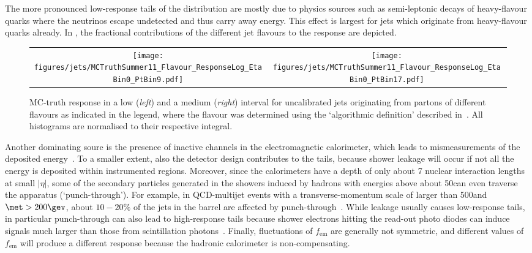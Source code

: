 The more pronounced low-response tails of the distribution are mostly due to physics sources such as semi-leptonic decays of heavy-flavour quarks where the neutrinos escape undetected and thus carry away energy.
This effect is largest for jets which originate from heavy-flavour quarks already.
In , the fractional contributions of the different jet flavours to the response are depicted.
\begin{figure}[!ht]
  \centering
  \begin{tabular}{cc}
    \texttt{[image: figures/jets/MCTruthSummer11\_Flavour\_ResponseLog\_EtaBin0\_PtBin9.pdf]} &
    \texttt{[image: figures/jets/MCTruthSummer11\_Flavour\_ResponseLog\_EtaBin0\_PtBin17.pdf]} \\
  \end{tabular}
  \caption{MC-truth response in a low (\textit{left}) and a medium (\textit{right}) \ptgen interval for uncalibrated jets originating from partons of different flavours as indicated in the legend, where the flavour was determined using the `algorithmic definition' described in~\cite{bib:CMS:FlavourTagging}.
    All histograms are normalised to their respective integral.
}
\label{fig:Jets:Response:ResponseTailFlavourContributions}
\end{figure}

Another dominating soure is the presence of inactive channels in the electromagnetic calorimeter, which leads to mismeasurements of the deposited energy~\cite{bib:phd:sueann}.
To a smaller extent, also the detector design contributes to the tails, because shower leakage will occur if not all the energy is deposited within instrumented regions.
Moreover, since the calorimeters have a depth of only about 7 nuclear interaction lengths at small $|\eta|$, some of the secondary particles generated in the showers induced by hadrons with energies above about 50\gev can even traverse the apparatus (`punch-through').
For example, in QCD-multijet events with a transverse-momentum scale of larger than 500\gev and \mbox{$\met > 200\gev$}, about $10-20\%$ of the jets in the barrel are affected by punch-through~\cite{bib:thesis:ulla}.
While leakage usually causes low-response tails, in particular punch-through can also lead to high-response tails because shower electrons hitting the read-out photo diodes can induce signals much larger than those from scintillation photons~\cite{wigmans:144}.
Finally, fluctuations of $f_{\text{em}}$ are generally not symmetric, and different values of $f_{\text{em}}$ will produce a different response because the hadronic calorimeter is non-compensating.


